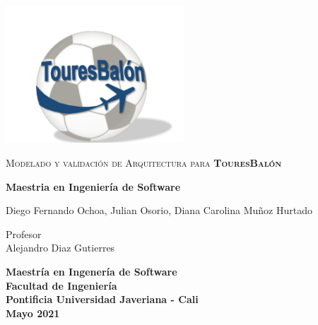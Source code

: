 \begin{titlepage}
	\centering
	\includegraphics[width=0.5\textwidth]{tb}\par\vspace{1cm}
	{\scshape\large Modelado y validación de Arquitectura para \textbf{TouresBalón} \par}
	\vspace{2cm}
	{ \textbf{Maestria en Ingeniería de Software}\par}
	\vspace{1.5cm}
	
	{ Diego Fernando Ochoa, Julian Osorio, Diana Carolina Mu\~noz Hurtado\par}
	\vspace{0.2cm}
	Profesor\\
	Alejandro Diaz Gutierres

	\vspace{2cm}
    
    {\bfseries Maestría en Ingener\'ia de Software \\
    Facultad de Ingenier\'ia\\
    Pontificia Universidad Javeriana - Cali\\
    \vspace{1.2cm}
    Mayo 2021\par}
    
\end{titlepage}